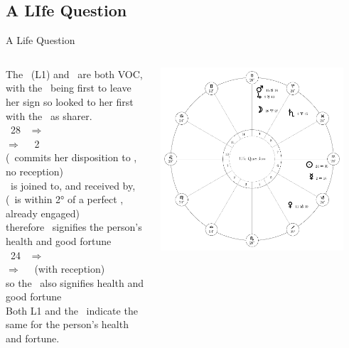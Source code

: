 \subsection{A LIfe Question}
\begin{frame}[t]{A Life Question}
\begin{columns}[T, onlytextwidth]
The \Sun\ (L1) and \Moon\ are both VOC, with the \Moon\ being first to leave her sign so looked to her first with the \Sun\ as sharer.\\
\vspace{0.25cm}
\Moon\ 28 \Aries\ $\Rightarrow$ \Taurus \\
$\Rightarrow$ \Square\ \Mercury\ 2 \Aquarius\ \\
\hspace{1em} (\Moon\ commits her disposition to \Mercury, no reception) \\
\Mercury\ is joined to, and received by, \Saturn\ \\
\hspace{1em}(\Mercury\ is within 2° of a perfect \Sextile, already engaged) \\
therefore \Saturn\ signifies the person's health and good fortune\\
\vspace{0.25cm}
\Sun\ 24 \Aquarius\ $\Rightarrow$ \Pisces \\
$\Rightarrow$ \Sextile\ \Jupiter\ (with reception) \\
so the \Sun\ also signifies health and good fortune \\
\vspace{0.25cm}
Both L1 and the \Moon\ indicate the same for the person's health and fortune.
\begin{center}
{\includegraphics[width=0.9\textwidth]{charts/22-chart-life}}
\end{center}
\end{columns}
\end{frame}
